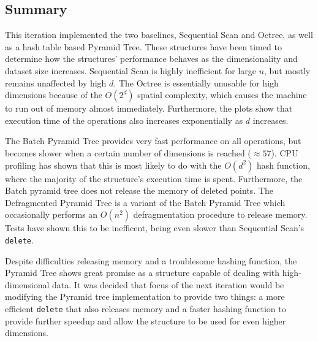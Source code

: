 \subsection{Summary}

This iteration implemented the two baselines, Sequential Scan and Octree, as well as a hash table based Pyramid Tree. These structures have been timed to determine how the structures' performance behaves as the dimensionality and dataset size increases. Sequential Scan is highly inefficient for large $n$, but mostly remains unaffected by high $d$. The Octree is essentially unusable for high dimensions because of the $O(2^d)$ spatial complexity, which causes the machine to run out of memory almost immediately. Furthermore, the plots show that execution time of the operations also increases exponentially as $d$ increases.

The Batch Pyramid Tree provides very fast performance on all operations, but becomes slower when a certain number of dimensions is reached ($\approx 57$). CPU profiling has shown that this is most likely to do with the $O(d^2)$ hash function, where the majority of the structure's execution time is spent. Furthermore, the Batch pyramid tree does not release the memory of deleted points. The Defragmented Pyramid Tree is a variant of the Batch Pyramid Tree which occasionally performs an $O(n^2)$ defragmentation procedure to release memory. Tests have shown this to be inefficent, being even slower than Sequential Scan's \texttt{delete}.

Despite difficulties releasing memory and a troublesome hashing function, the Pyramid Tree shows great promise as a structure capable of dealing with high-dimensional data. It was decided that focus of the next iteration would be modifying the Pyramid tree implementation to provide two things: a more efficient \texttt{delete} that also releases memory and a faster hashing function to provide further speedup and allow the structure to be used for even higher dimensions.